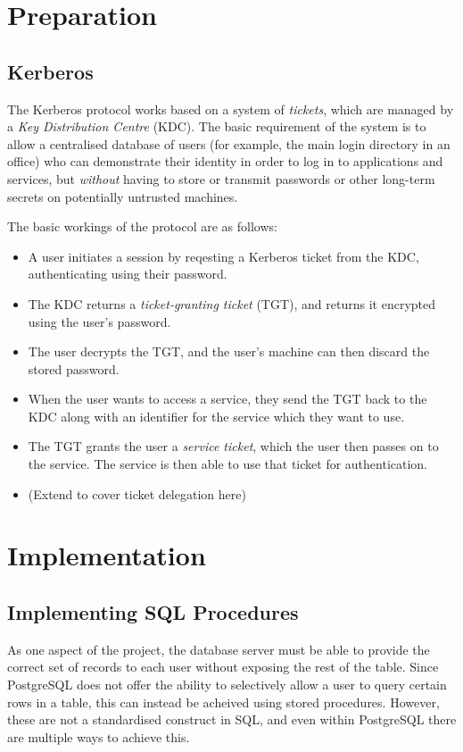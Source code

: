 \documentclass{article}
\begin{document}
\section{Preparation}

\subsection{Kerberos}
The Kerberos protocol works based on a system of \textit{tickets}, which are managed by a \textit{Key Distribution Centre} (KDC). The basic requirement of the system is to allow a centralised database of users (for example, the main login directory in an office) who can demonstrate their identity in order to log in to applications and services, but \textit{without} having to store or transmit passwords or other long-term secrets on potentially untrusted machines.

The basic workings of the protocol are as follows:

\begin{itemize}
\item
  A user initiates a session by reqesting a Kerberos ticket from the KDC, authenticating using their password.
\item
  The KDC returns a \textit{ticket-granting ticket} (TGT), and returns it encrypted using the user's password.
\item
  The user decrypts the TGT, and the user's machine can then discard the stored password.
\item
  When the user wants to access a service, they send the TGT back to the KDC along with an identifier for the service which they want to use.
\item
  The TGT grants the user a \textit{service ticket}, which the user then passes on to the service. The service is then able to use that ticket for authentication.
\item
  (Extend to cover ticket delegation here)
\end{itemize}

\section{Implementation}

\subsection{Implementing SQL Procedures}
As one aspect of the project, the database server must be able to provide the correct set of records to each user without exposing the rest of the table. Since PostgreSQL does not offer the ability to selectively allow a user to query certain rows in a table, this can instead be acheived using stored procedures. However, these are not a standardised construct in SQL, and even within PostgreSQL there are multiple ways to achieve this.
\end{document}
